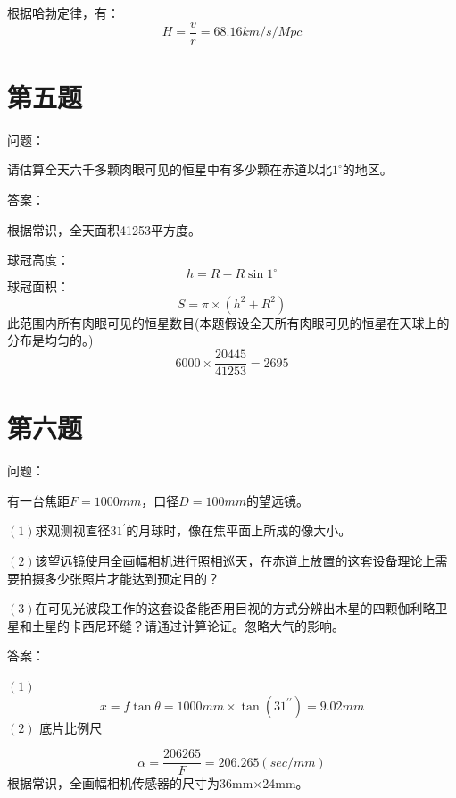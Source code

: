 \documentclass[a4paper,12pt]{report}
\begin{document}
\noindent 根据哈勃定律，有：
\begin{equation}
	H=\frac{v}{r}=68.16km/s/Mpc
\end{equation}

\section{第五题}

\noindent 问题：

\noindent 请估算全天六千多颗肉眼可见的恒星中有多少颗在赤道以北$1^\circ$的地区。

\noindent 答案：

\noindent 根据常识，全天面积41253平方度。

\noindent 球冠高度：
\begin{equation}
	h=R-R\sin{1^\circ }
\end{equation}
\noindent 球冠面积：
\begin{equation}
	S=\pi \times(h^2+R^2)
\end{equation}
\noindent 此范围内所有肉眼可见的恒星数目(本题假设全天所有肉眼可见的恒星在天球上的分布是均匀的。)
\begin{equation}
	6000\times \frac{20445}{41253}=2695
\end{equation}

\section{第六题}
\noindent 问题：

有一台焦距$F=1000mm$，口径$D=100mm$的望远镜。

\noindent $\left(1\right)$求观测视直径$31^\prime$的月球时，像在焦平面上所成的像大小。

\noindent $\left(2\right)$该望远镜使用全画幅相机进行照相巡天，在赤道上放置的这套设备理论上需要拍摄多少张照片才能达到预定目的？

\noindent $\left(3\right)$在可见光波段工作的这套设备能否用目视的方式分辨出木星的四颗伽利略卫星和土星的卡西尼环缝？请通过计算论证。忽略大气的影响。

\noindent 答案：

\noindent $\left(1\right)$
\begin{equation}
	x=f\tan {\theta}=1000mm\times \tan(31^{\prime\prime})=9.02mm
\end{equation}
$\left(2\right)$
底片比例尺

\begin{equation}
	\alpha=\frac{206265}{F}=206.265(sec/mm)
\end{equation}
\noindent 根据常识，全画幅相机传感器的尺寸为36mm$\times$24mm。
\end{document}
